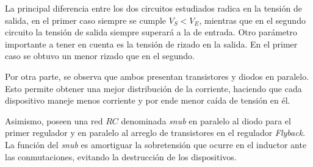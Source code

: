 La principal diferencia entre los dos circuitos estudiados radica en la tensión de salida, en el primer caso siempre se cumple $V_S < V_E$, mientras que en el segundo circuito la tensión de salida siempre superará a la de entrada.
Otro parámetro importante a tener en cuenta es la tensión de rizado en la salida. En el primer caso se obtuvo un menor rizado que en el segundo. 

Por otra parte, se observa que ambos presentan transistores y diodos en paralelo. Esto permite obtener una mejor distribución de la corriente, haciendo que cada dispositivo maneje menos corriente y por ende menor caída de tensión en él.

Asimismo, poseen una red $RC$ denominada \textit{snub} en paralelo al diodo para el primer regulador y en paralelo al arreglo de transistores en el regulador \textit{Flyback}. La función del \textit{snub} es amortiguar la sobretensión que ocurre en el inductor ante las conmutaciones, evitando la destrucción de los dispositivos.



